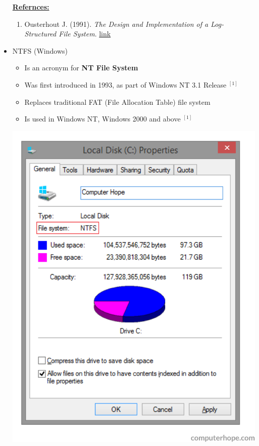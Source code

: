 \documentclass[12pt]{article}
\begin{document}
\begin{itemize}
    \bigskip

    \underline{\textbf{Refernces:}}

    \bigskip

    \begin{enumerate}[1)]
        \item Ousterhout J. (1991). \textit{The Design and Implementation of a Log-Structured File System}. \href{https://people.eecs.berkeley.edu/~brewer/cs262/LFS.pdf}{link}
    \end{enumerate}
    \item NTFS (Windows)
    \begin{itemize}
        \item Is an acronym for \textbf{NT File System}
        \item Was first introduced in 1993, as part of Windows NT 3.1 Release $^{[1]}$
        \item Replaces traditional FAT (File Allocation Table) file system
        \item Is used in Windows NT, Windows 2000 and above $^{[1]}$
    \end{itemize}

    \begin{center}
        \includegraphics[width=0.8\linewidth]{images/week_9_notes_1_11.png}
    \end{center}


\end{itemize}
\end{document}
